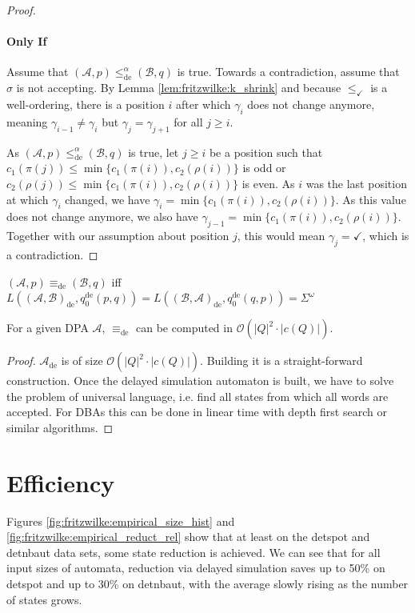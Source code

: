 \begin{proof}
	\paragraph{Only If} Assume that $(\mathcal{A}, p) \leq_\text{de}^\alpha (\mathcal{B}, q)$ is true. Towards a contradiction, assume that $\sigma$ is not accepting. By Lemma \ref{lem:fritzwilke:k_shrink} and because $\leq_\checkmark$ is a well-ordering, there is a position $i$ after which $\gamma_i$ does not change anymore, meaning $\gamma_{i-1} \neq \gamma_i$ but $\gamma_j = \gamma_{j+1}$ for all $j \geq i$.
	
	As $(\mathcal{A}, p) \leq_\text{de}^\alpha (\mathcal{B}, q)$ is true, let $j \geq i$ be a position such that $c_1(\pi(j)) \leq \min \{c_1(\pi(i)), c_2(\rho(i))\}$ is odd or $c_2(\rho(j)) \leq \min \{c_1(\pi(i)), c_2(\rho(i))\}$ is even. As $i$ was the last position at which $\gamma_i$ changed, we have $\gamma_i = \min \{c_1(\pi(i)), c_2(\rho(i))\}$. As this value does not change anymore, we also have $\gamma_{j-1} = \min \{c_1(\pi(i)), c_2(\rho(i))\}$. Together with our assumption about position $j$, this would mean $\gamma_j = \checkmark$, which is a contradiction.
\end{proof}

\begin{cor}
	$(\mathcal{A}, p) \equiv_\text{de} (\mathcal{B}, q)$ iff $L((\mathcal{A}, \mathcal{B})_\text{de}, q_0^\text{de}(p, q)) = L((\mathcal{B}, \mathcal{A})_\text{de}, q_0^\text{de}(q, p)) = \Sigma^\omega$
\end{cor}

\vspace{10pt}

\begin{theorem}
	For a given DPA $\mathcal{A}$, $\equiv_\text{de}$ can be computed in $\mathcal{O}(|Q|^2 \cdot |c(Q)|)$.
\end{theorem}

\begin{proof}
	$\mathcal{A}_\text{de}$ is of size $\mathcal{O}(|Q|^2 \cdot |c(Q)|)$. Building it is a straight-forward construction. Once the delayed simulation automaton is built, we have to solve the problem of universal language, i.e. find all states from which all words are accepted. For DBAs this can be done in linear time with depth first search or similar algorithms.
\end{proof}




\section{Efficiency}
Figures \ref{fig:fritzwilke:empirical_size_hist} and \ref{fig:fritzwilke:empirical_reduct_rel} show that at least on the \textsf{detspot} and \textsf{detnbaut} data sets, some state reduction is achieved. We can see that for all input sizes of automata, reduction via delayed simulation saves up to 50\% on \textsf{detspot} and up to 30\% on \textsf{detnbaut}, with the average slowly rising as the number of states grows.

